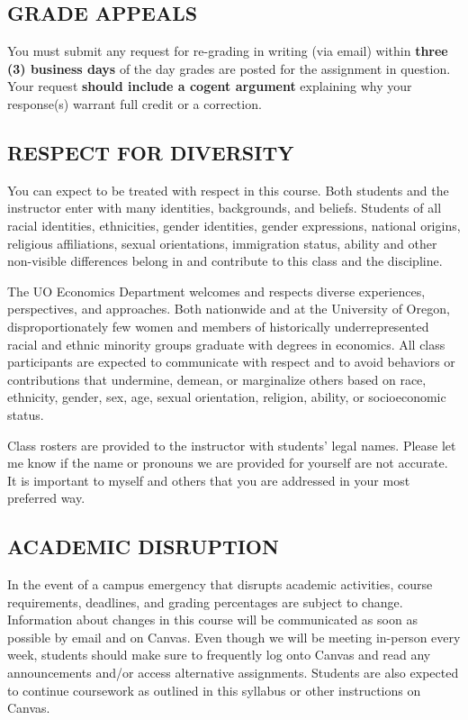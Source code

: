 \documentclass[11pt]{article}
\begin{document}
\subsection*{GRADE APPEALS}
You must submit any request for re-grading in writing (via email) within \textbf{three (3) business days} of the day grades are posted for the assignment in question. 
Your request \textbf{should include a cogent argument} explaining why your response(s) warrant full credit or a correction.

\subsection*{RESPECT FOR DIVERSITY}
You can expect to be treated with respect in this course.
Both students and the instructor enter with many identities, backgrounds, and beliefs.
Students of all racial identities, ethnicities, gender identities, gender expressions, national origins, religious affiliations, sexual orientations, immigration status, ability and other non-visible differences belong in and contribute to this class and the discipline.

The UO Economics Department welcomes and respects diverse experiences, perspectives, and approaches. 
Both nationwide and at the University of Oregon, disproportionately few women and members of historically underrepresented racial and ethnic minority groups graduate with degrees in economics. 
All class participants are expected to communicate with respect and to avoid behaviors or contributions that undermine, demean, or marginalize others based on race, ethnicity, gender, sex, age, sexual orientation, religion, ability, or socioeconomic status.

Class rosters are provided to the instructor with students' legal names.
Please let me know if the name or pronouns we are provided for yourself are not accurate.
It is important to myself and others that you are addressed in your most preferred way.

\subsection*{ACADEMIC DISRUPTION}
In the event of a campus emergency that disrupts academic activities, course requirements, deadlines, and grading percentages are subject to change. 
Information about changes in this course will be communicated as soon as possible by email and on Canvas. 
Even though we will be meeting in-person every week, students should make sure to frequently log onto Canvas and read any announcements and/or access alternative assignments. 
Students are also expected to continue coursework as outlined in this syllabus or other instructions on Canvas. 

\vspace{1.5in}


\end{document}
